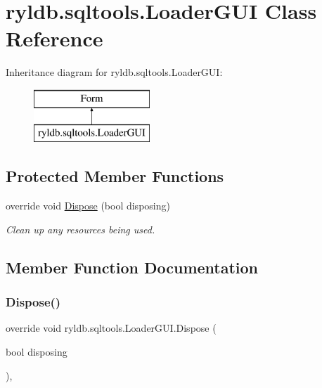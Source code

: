 \hypertarget{classryldb_1_1sqltools_1_1_loader_g_u_i}{}\section{ryldb.\+sqltools.\+Loader\+G\+UI Class Reference}
\label{classryldb_1_1sqltools_1_1_loader_g_u_i}
Inheritance diagram for ryldb.\+sqltools.\+Loader\+G\+UI\+:\begin{figure}[H]
\begin{center}
\leavevmode
\includegraphics[height=2.000000cm]{classryldb_1_1sqltools_1_1_loader_g_u_i}
\end{center}
\end{figure}
\subsection*{Protected Member Functions}
\begin{DoxyCompactItemize}
\item 
override void \hyperlink{classryldb_1_1sqltools_1_1_loader_g_u_i_a9a6364080b0d94db82d89f5258af6c1c}{Dispose} (bool disposing)
\begin{DoxyCompactList}\small\item\em Clean up any resources being used. \end{DoxyCompactList}\end{DoxyCompactItemize}


\subsection{Member Function Documentation}
\mbox{\label{classryldb_1_1sqltools_1_1_loader_g_u_i_a9a6364080b0d94db82d89f5258af6c1c}} 
\subsubsection{\texorpdfstring{Dispose()}{Dispose()}}
{\footnotesize\ttfamily override void ryldb.\+sqltools.\+Loader\+G\+U\+I.\+Dispose (\begin{DoxyParamCaption}\item[{bool}]{disposing }\end{DoxyParamCaption})\hspace{0.3cm}{\ttfamily [inline]}, {\ttfamily [protected]}}



